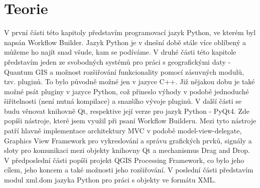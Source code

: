 \chapter{Teorie}
V první části této kapitoly představím programovací jazyk Python, ve kterém byl napsán Workflow Builder. Jazyk Python je v dnešní době stále více oblíbený a můžeme ho najít snad všude, kam se podíváme. V druhé části této kapitole představím jeden ze svobodných systémů pro práci s geografickými daty - Quantum GIS a možnost rozšiřování funkcionality pomocí zásuvných modulů, tzv. pluginů. To bylo původně možné jen v jazyce C++. Již nějakou dobu je také možné psát pluginy v jazyce Python, což přineslo výhody v podobě jednoduché šiřitelnosti (není nutná kompilace) a snazšího vývoje pluginů. V další části se budu věnovat knihovně Qt, respektive její verze pro jazyk Python - PyQt4. Zde popíši nástroje, které jsem využil při psaní Workflow Builderu. Mezi tyto nástroje patří hlavně implementace architektury MVC v podobě model-view-delegate, Graphics View Framework pro vykreslování a správu grafických prvků, signály a sloty pro komunikaci mezi objekty knihovny Qt a mechanismus Drag and Drop. V předposlední části popíši projekt QGIS Processing Framework, co bylo jeho cílem, jeho koncem a také možnosti jeho rozšiřování.  V poslední části představím modul xml.dom jazyka Python pro práci s objekty ve formátu XML.

\newpage




